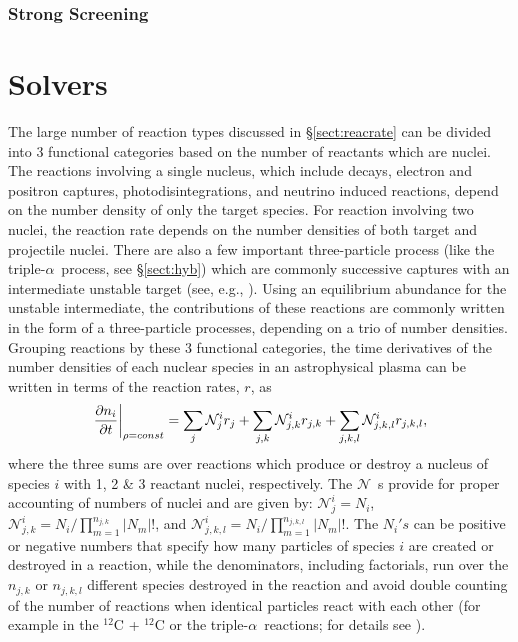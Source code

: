 \documentclass[12pt,modern,tighten,times,apj]{aastex61}
\newcommand{\eg}{e.g.}
\newcommand{\alp}{\ensuremath{\alpha}}
\newcommand{\calN}{\ensuremath {\mathcal N}}
\newcommand{\isotope}[2]{\ensuremath{\mathrm{^{#2}#1}}}
\begin{document}
\subsubsection{Strong Screening}  



\section{Solvers}

The large number of reaction types discussed in \S \ref{sect:reacrate} can 
be divided into 3 functional categories based on the number of reactants 
which are nuclei.  The reactions involving a single nucleus, which include 
decays, electron and positron captures, photodisintegrations, and neutrino 
induced reactions, depend on the number density of only the target species.  
For reaction involving two nuclei, the reaction rate depends on the number 
densities of both target and projectile nuclei.  There are also a few 
important three-particle process (like the triple-\alp\ process, see \S \ref{sect:hyb}) which are commonly successive captures with an 
intermediate unstable target (see, \eg, \cite{NoTM85,GoWT95}).  Using an 
equilibrium abundance for the unstable intermediate, the contributions of 
these reactions are commonly written in the form of a three-particle 
processes, depending on a trio of number densities.  Grouping reactions by 
these 3 functional categories, the time derivatives of the number densities 
of each nuclear species in an astrophysical plasma can be written in terms 
of the reaction rates, $r$, as
\begin{equation}
    \left. {{\partial n_i} \over {\partial t}} \right|_{\rho =const}= \sum_j 
    \calN^i _j r_j + \sum_{j,k} \calN^i _{j,k} r_{j,k} + \sum_{j,k,l} 
    \calN^i _{j,k,l} r_{j,k,l},
    \label{eq:ndot}
\end{equation}
where the three sums are over reactions which produce or destroy a nucleus 
of species $i$ with 1, 2 \& 3 reactant nuclei, respectively.  The \calN\ s
provide for proper accounting of numbers of nuclei and are given by: 
$\calN^i_j = N_i$, $\calN^i_{j,k} = N_i / \prod_{m=1}^{n_{j,k}} | N_{m} |!  
$, and $\calN^i_{j,k,l} = N_i / \prod_{m=1}^{n_{j,k,l}} |N_{m}|!$.  The $N_i's$ 
can be positive or negative numbers that specify how many particles of 
species $i$ are created or destroyed in a reaction, while the denominators, 
including factorials, run over the $n_{j,k}$ or $n_{j,k,l}$ different species destroyed in the reaction and avoid double counting of the number of reactions when identical particles react with each other (for example in the \isotope{C}{12} + \isotope{C}{12} or the triple-\alp\ reactions; for details see \cite{FoCZ67}).
\end{document}
